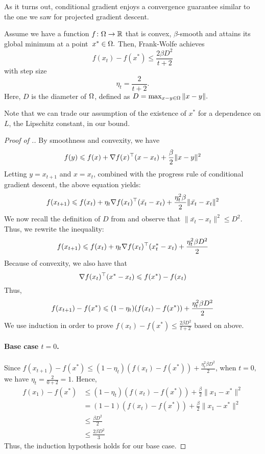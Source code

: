 As it turns out, conditional gradient enjoys a convergence guarantee similar to
the one we saw for projected gradient descent.

\begin{theorem}
Assume we have a function $f\colon\Omega\to\mathbb{R}$ that is convex, $\beta$-smooth
and attains its global minimum at a point~$x^*\in\Omega.$ Then, Frank-Wolfe achieves
$$ f(x_t) - f(x^*) \leq \frac{2\beta D^2}{t+2}$$
with step size $$\eta_t = \frac{2}{t+2}.$$
Here, $D$ is the diameter of $\Omega$, defined as
$ D = \max_{x-y \in \Omega} \| x-y \|.$ 
\end{theorem}
Note that we can trade our assumption of the existence of $x^*$ for a dependence on $L$, the Lipschitz constant, in our bound.

\begin{proof}[Proof of .]
By smoothness and convexity, we have
$$ f(y) \leqslant f(x) +\nabla f(x) ^\top (x-x_t) + \frac{\beta}{2} \| x-y \| ^2 $$
Letting $ y = x_{t+1} $ and $x= x_t$, combined with the progress rule of conditional gradient descent, the above equation yields:
$$ f(x_{t+1}) \leqslant f(x_t) + \eta_t \nabla f(x_t) ^\top (\bar{x_t} - x_t) + \frac{\eta_t^2\beta}{2} \| \bar{x_t} - x_t \| ^2 $$
We now recall the definition of $D$ from  and observe that $\| \bar{x_t} - x_t \| ^2 \leq D^2$. Thus, we rewrite the inequality:
$$ f(x_{t+1}) \leqslant f(x_t) + \eta_t \nabla f(x_t) ^\top (x_t^* - x_t) + \frac{\eta_t^2\beta D ^2}{2} $$
Because of convexity, we also have that
$$ \nabla f(x_t) ^\top (x^*-x_t) \leqslant f(x^*) - f(x_t) $$
Thus,
\begin{equation}\equationlabel{convergenceInequal}
f(x_{t+1})-f(x^*) \leq (1-\eta_t)(f(x_t)-f(x^*)) + \frac{\eta_t^2\beta D ^2}{2}
\end{equation}
We use induction in order to prove $f(x_t)-f(x^*) \leq \frac{2\beta D^2}{t+2}$  based on  above.

\paragraph{Base case $t=0$.}
Since $ f(x_{t+1})-f(x^*) \leq (1-\eta_t)(f(x_t)-f(x^*)) + \frac{\eta_t^2\beta D ^2}{2}$, 
when $t=0,$ we have $\eta_t =\frac{2}{0+2}=1.$ Hence, 
\begin{align*} 
f(x_1)-f(x^*) &\leq (1-\eta_t)(f(x_t)-f(x^*)) + \frac{\beta}{2}\| x_1-x^* \|^2 \\
&= (1-1)(f(x_t)-f(x^*)) + \frac{\beta}{2}\| x_1-x^* \|^2 \\
&\leq \frac{\beta D^2}{2}\\
&\leq \frac{2\beta D^2}{3}
\end{align*}
Thus, the induction hypothesis holds for our base case.


\end{proof}
